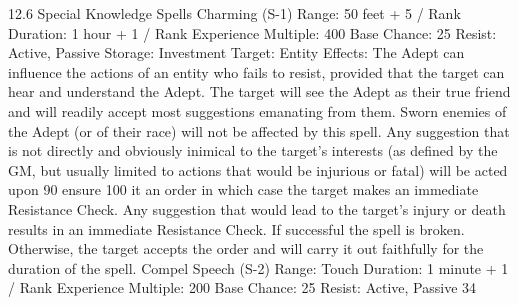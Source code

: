 \documentclass[a4paper]{article}
\begin{document}
\begin{multicols}{3}
12.6 Special Knowledge Spells
Charming (S-1)
Range: 50 feet + 5 / Rank
Duration: 1 hour + 1 / Rank
Experience Multiple: 400
Base Chance: 25%
Resist: Active, Passive
Storage: Investment
Target: Entity
Effects: The Adept can influence the actions of an
entity who fails to resist, provided that the target
can hear and understand the Adept. The target will
see the Adept as their true friend and will readily
accept most suggestions emanating from them.
Sworn enemies of the Adept (or of their race) will
not be affected by this spell. Any suggestion that is
not directly and obviously inimical to the target’s
interests (as defined by the GM, but usually limited
to actions that would be injurious or fatal) will be
acted upon 90%
ensure 100%
it an order in which case the target makes an immediate Resistance Check. Any suggestion that
would lead to the target’s injury or death results in
an immediate Resistance Check. If successful the
spell is broken. Otherwise, the target accepts the
order and will carry it out faithfully for the duration of the spell.
Compel Speech (S-2)
Range: Touch
Duration: 1 minute + 1 / Rank
Experience Multiple: 200
Base Chance: 25%
Resist: Active, Passive
34


\end{multicols}
\end{document}
